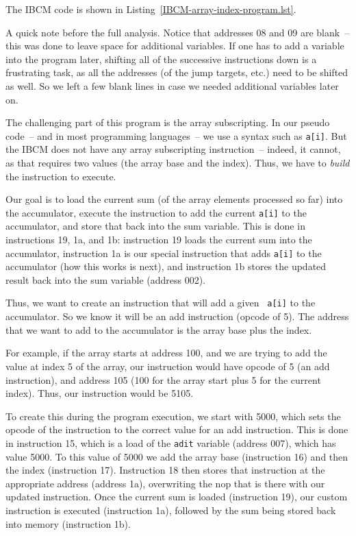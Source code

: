 The IBCM code is shown in Listing~\ref{IBCM-array-index-program.lst}.

\begin{figure}[h!]

\end{figure}

A quick note before the full analysis.  Notice that addresses 08
and 09 are blank~-- this was done to leave space for additional
variables.  If one has to add a variable into the program later,
shifting all of the successive instructions down is a frustrating
task, as all the addresses (of the jump targets, etc.)  need to be
shifted as well. So we left a few blank lines in case we needed
additional variables later on.

The challenging part of this program is the array subscripting.  In
our pseudo code~-- and in most programming languages~-- we use a syntax
such as {\tt a[i]}.  But the IBCM does not have any array subscripting
instruction~-- indeed, it cannot, as that requires two values (the
array base and the index). Thus, we have to {\em build} the
instruction to execute.

Our goal is to load the current sum (of the array elements processed
so far) into the accumulator, execute the instruction to add the
current {\tt a[i]} to the accumulator, and store that back into the
sum variable.  This is done in instructions 19, 1a, and 1b:
instruction 19 loads the current sum into the accumulator, instruction
1a is our special instruction that adds {\tt a[i]} to the accumulator
(how this works is next), and instruction 1b stores the updated result
back into the sum variable (address 002).

Thus, we want to create an instruction that will add a given {\tt
  a[i]} to the accumulator.  So we know it will be an add instruction
(opcode of 5).  The address that we want to add to the accumulator is
the array base plus the index.

For example, if the array starts at address 100, and we are trying to
add the value at index 5 of the array, our instruction would have
opcode of 5 (an add instruction), and address 105 (100 for the array
start plus 5 for the current index).  Thus, our instruction would be
5105.

To create this during the program execution, we start with 5000, which
sets the opcode of the instruction to the correct value for an add
instruction.  This is done in instruction 15, which is a load of the
{\tt adit} variable (address 007), which has value 5000.  To this
value of 5000 we add the array base (instruction 16) and then the
index (instruction 17).  Instruction 18 then stores that instruction
at the appropriate address (address 1a), overwriting the nop that is
there with our updated instruction.  Once the current sum is loaded
(instruction 19), our custom instruction is executed (instruction 1a),
followed by the sum being stored back into memory (instruction 1b).


